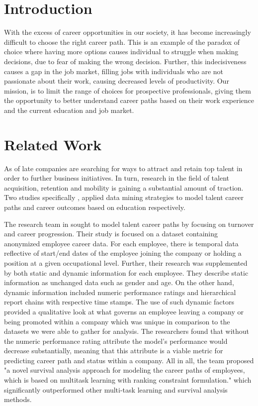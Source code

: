 \section{Introduction}
With the excess of career opportunities in our society, it has become increasingly difficult to choose the right career path. This is an example of  the paradox of choice where having more options causes individual to struggle when making decisions, due to fear of making the wrong decision. Further, this indecisiveness causes a gap in the job market, filling jobs with individuals who are not passionate about their work, causing decreased levels of productivity. Our mission, is to limit the range of choices for prospective professionals, giving them the opportunity to better understand career paths based on their work experience and the current education and job market. 

\section{Related Work}
As of late companies are searching for ways to attract and retain top talent in order to further business initiatives. In turn,  research in the field of talent acquisition, retention and mobility is gaining a substantial amount of traction. Two studies specifically \cite{li2017, kapur2016}, applied data mining strategies to model talent career paths and career outcomes based on education respectively. 

The research team in \cite{li2017} sought to model talent career paths by focusing on turnover and career progression. Their study is focused on a dataset containing anonymized employee career data. For each employee, there is temporal data reflective of start/end dates of the employee joining the company or holding a position at a given occupational level. Further, their research was supplemented by both static and dynamic information for each employee. They describe static information as unchanged data such as gender and age. On the other hand, dynamic information included numeric performance ratings and hierarchical report chains with respective time stamps. The use of such dynamic factors provided a qualitative look at what governs an employee leaving a company or being promoted within a company which was unique in comparison to the datasets we were able to gather for analysis. The researchers found that without the numeric performance rating attribute the model's performance would decrease substantially, meaning that this attribute is a viable metric for predicting career path and status within a company.  All in all, the team proposed "a novel survival analysis approach for modeling the career paths of employees, which is based on multitask learning with ranking constraint formulation."\cite{li2017} which significantly outperformed other multi-task learning and survival analysis methods. 

